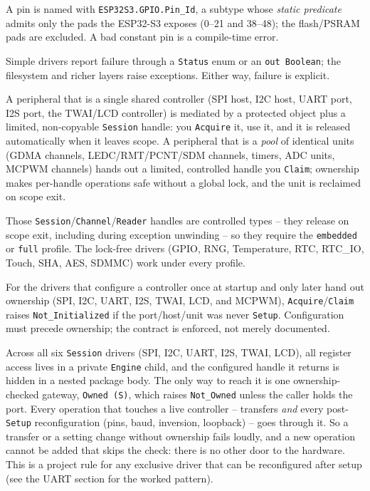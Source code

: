 \begin{description}[style=nextline]
\item[Valid-pin types.] A pin is named with \texttt{ESP32S3.GPIO.Pin\_Id}, a
  subtype whose \emph{static predicate} admits only the pads the ESP32-S3 exposes
  (0--21 and 38--48); the flash/PSRAM pads are excluded. A bad constant pin is a
  compile-time error.
\item[Errors.] Simple drivers report failure through a \texttt{Status} enum or an
  \texttt{out Boolean}; the filesystem and richer layers raise exceptions. Either
  way, failure is explicit.
\item[Task-safety, two shapes.] A peripheral that is a single shared controller
  (SPI host, I2C host, UART port, I2S port, the TWAI/LCD controller) is mediated
  by a protected object plus a limited, non-copyable \texttt{Session} handle: you
  \texttt{Acquire} it, use it, and it is released automatically when it leaves
  scope. A peripheral that is a \emph{pool} of identical units (GDMA channels,
  LEDC/RMT/PCNT/SDM channels, timers, ADC units, MCPWM channels) hands out a
  limited, controlled handle you \texttt{Claim}; ownership makes per-handle
  operations safe without a global lock, and the unit is reclaimed on scope exit.
\item[RAII.] Those \texttt{Session}/\texttt{Channel}/\texttt{Reader} handles are
  controlled types -- they release on scope exit, including during exception
  unwinding -- so they require the \texttt{embedded} or \texttt{full} profile.
  The lock-free drivers (GPIO, RNG, Temperature, RTC, RTC\_IO, Touch, SHA, AES,
  SDMMC) work under every profile.
\item[Init-before-use guard.] For the drivers that configure a controller once
  at startup and only later hand out ownership (SPI, I2C, UART, I2S, TWAI, LCD,
  and MCPWM), \texttt{Acquire}/\texttt{Claim} raises \texttt{Not\_Initialized} if
  the port/host/unit was never \texttt{Setup}. Configuration must precede
  ownership; the contract is enforced, not merely documented.
\item[Ownership gateway.] Across all six \texttt{Session} drivers (SPI, I2C,
  UART, I2S, TWAI, LCD), all register access lives in a private \texttt{Engine}
  child, and the configured handle it returns is hidden in a nested package body.
  The only way to reach it is one ownership-checked gateway, \texttt{Owned (S)},
  which raises \texttt{Not\_Owned} unless the caller holds the port. Every
  operation that touches a live controller -- transfers \emph{and} every
  post-\texttt{Setup} reconfiguration (pins, baud, inversion, loopback) -- goes
  through it. So a transfer or a setting change without ownership fails loudly,
  and a new operation cannot be added that skips the check: there is no other
  door to the hardware. This is a project rule for any exclusive driver that can
  be reconfigured after setup (see the UART section for the worked pattern).
\end{description}

